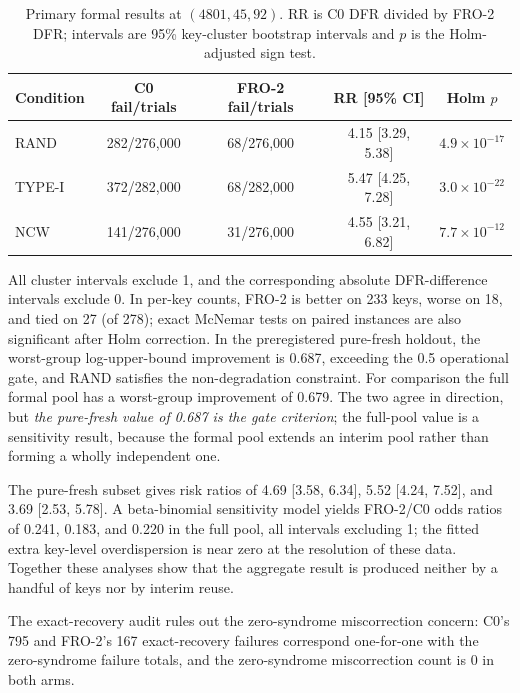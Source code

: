 \documentclass[lettersize,journal]{IEEEtran}
\begin{document}
\begin{table}[t]
\centering
\caption{Primary formal results at $(4801,45,92)$. RR is C0 DFR divided by FRO-2 DFR; intervals are 95\% key-cluster bootstrap intervals and $p$ is the Holm-adjusted sign test.}
\label{tab:main}
\footnotesize
\setlength{\tabcolsep}{3pt}
\begin{tabular}{@{}lcccc@{}}
\toprule
Condition & C0 fail/trials & FRO-2 fail/trials & RR [95\% CI] & Holm $p$ \\
\midrule
RAND & 282/276{,}000 & 68/276{,}000 & 4.15 [3.29, 5.38] & $4.9\times10^{-17}$ \\
TYPE-I & 372/282{,}000 & 68/282{,}000 & 5.47 [4.25, 7.28] & $3.0\times10^{-22}$ \\
NCW & 141/276{,}000 & 31/276{,}000 & 4.55 [3.21, 6.82] & $7.7\times10^{-12}$ \\
\bottomrule
\end{tabular}
\end{table}

All cluster intervals exclude 1, and the corresponding absolute DFR-difference intervals exclude 0. In per-key counts, FRO-2 is better on 233 keys, worse on 18, and tied on 27 (of 278); exact McNemar tests on paired instances are also significant after Holm correction. In the preregistered pure-fresh holdout, the worst-group log-upper-bound improvement is 0.687, exceeding the 0.5 operational gate, and RAND satisfies the non-degradation constraint. For comparison the full formal pool has a worst-group improvement of 0.679. The two agree in direction, but \emph{the pure-fresh value of 0.687 is the gate criterion}; the full-pool value is a sensitivity result, because the formal pool extends an interim pool rather than forming a wholly independent one.

The pure-fresh subset gives risk ratios of 4.69 [3.58, 6.34], 5.52 [4.24, 7.52], and 3.69 [2.53, 5.78]. A beta-binomial sensitivity model yields FRO-2/C0 odds ratios of 0.241, 0.183, and 0.220 in the full pool, all intervals excluding 1; the fitted extra key-level overdispersion is near zero at the resolution of these data. Together these analyses show that the aggregate result is produced neither by a handful of keys nor by interim reuse.

The exact-recovery audit rules out the zero-syndrome miscorrection concern: C0's 795 and FRO-2's 167 exact-recovery failures correspond one-for-one with the zero-syndrome failure totals, and the zero-syndrome miscorrection count is 0 in both arms.
\end{document}
